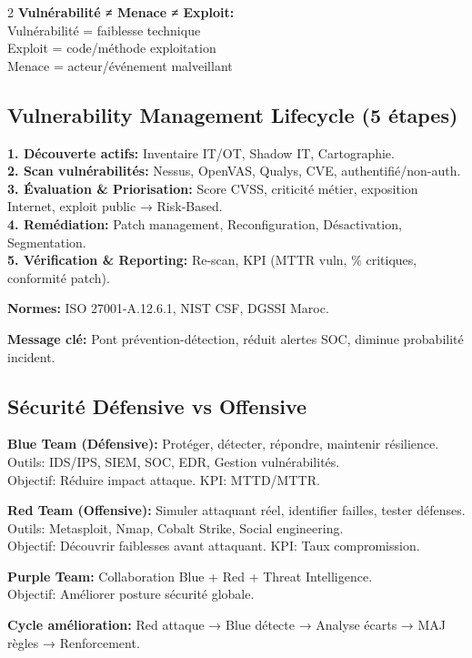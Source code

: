\documentclass[9pt,a4paper]{extarticle}
\begin{document}
\begin{multicols}{2}
\textbf{Vulnérabilité ≠ Menace ≠ Exploit:}\\
Vulnérabilité = faiblesse technique\\
Exploit = code/méthode exploitation\\
Menace = acteur/événement malveillant

\subsection*{Vulnerability Management Lifecycle (5 étapes)}
\textbf{1. Découverte actifs:} Inventaire IT/OT, Shadow IT, Cartographie.\\
\textbf{2. Scan vulnérabilités:} Nessus, OpenVAS, Qualys, CVE, authentifié/non-auth.\\
\textbf{3. Évaluation \& Priorisation:} Score CVSS, criticité métier, exposition Internet, exploit public → Risk-Based.\\
\textbf{4. Remédiation:} Patch management, Reconfiguration, Désactivation, Segmentation.\\
\textbf{5. Vérification \& Reporting:} Re-scan, KPI (MTTR vuln, \% critiques, conformité patch).

\textbf{Normes:} ISO 27001-A.12.6.1, NIST CSF, DGSSI Maroc.

\textbf{Message clé:} Pont prévention-détection, réduit alertes SOC, diminue probabilité incident.

\subsection*{Sécurité Défensive vs Offensive}

\textbf{Blue Team (Défensive):} Protéger, détecter, répondre, maintenir résilience.\\
Outils: IDS/IPS, SIEM, SOC, EDR, Gestion vulnérabilités.\\
Objectif: Réduire impact attaque. KPI: MTTD/MTTR.

\textbf{Red Team (Offensive):} Simuler attaquant réel, identifier failles, tester défenses.\\
Outils: Metasploit, Nmap, Cobalt Strike, Social engineering.\\
Objectif: Découvrir faiblesses avant attaquant. KPI: Taux compromission.

\textbf{Purple Team:} Collaboration Blue + Red + Threat Intelligence.\\
Objectif: Améliorer posture sécurité globale.

\textbf{Cycle amélioration:} Red attaque → Blue détecte → Analyse écarts → MAJ règles → Renforcement.


\end{multicols}
\end{document}
